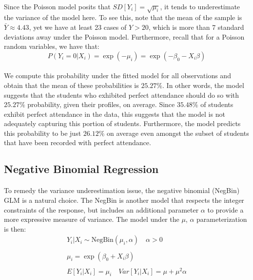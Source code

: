 \documentclass[12pt, titlepage]{article}
\begin{document}
	\paragraph{}Since the Poisson model posits that $SD[Y_i] = \sqrt{\mu_i}$, it tends to underestimate the variance of the model here. To see this, note that the mean of the sample is $\bar{Y} \approx 4.43$, yet we have at least 23 cases of $Y > 20$, which is more than 7 standard deviations away under the Poisson model. Furthermore, recall that for a Poisson random variables, we have that:
	$$
	P(Y_i = 0 | X_i) = \exp(-\mu_i) = \exp(-\beta_0 - X_i\beta)
	$$
	\paragraph{} We compute this probability under the fitted model for all observations and obtain that the mean of these probabilities is $25.27\%$. In other words, the model suggests that the students who exhibited perfect attendance should do so with $25.27\%$ probability, given their profiles, on average. Since $35.48\%$ of students exhibit perfect attendance in the data, this suggests that the model is not adequately capturing this portion of students. Furthermore, the model predicts this probability to be just $26.12\%$ on average even amongst the subset of students that have been recorded with perfect attendance.
	
	\subsection{Negative Binomial Regression}
	
	\paragraph{} To remedy the variance underestimation issue, the negative binomial (NegBin) GLM is a natural choice. The NegBin is another model that respects the integer constraints of the response, but includes an additional parameter $\alpha$ to provide a more expressive measure of variance. The model under the $\mu$, $\alpha$ parameterization is then:
	\begin{gather*}
	Y_i|X_i \sim \text{NegBin}(\mu_i, \alpha) \quad \alpha > 0\\ \\
	\mu_i = \exp(\beta_0 + X_i\beta) \\ \\
	E[Y_i|X_i] = \mu_i \quad Var[Y_i|X_i] = \mu + \mu^2\alpha
	\end{gather*}
\end{document}
